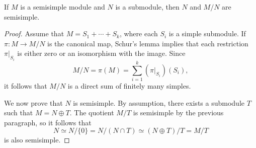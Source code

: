 \begin{proposition}
    If $M$ is a semisimple module and $N$ is a submodule, then $N$ and $M/N$ are semisimple.	
\end{proposition}

\begin{proof}
	Assume that $M=S_1+\cdots+ S_k$, where each $S_i$ is a simple submodule. If $\pi\colon M\to M/N$ 
	is the canonical map, Schur's lemma implies that each restriction $\pi|_{S_i}$ 
	is either zero or an isomorphism with the image. Since  
	\[
	M/N=\pi(M)=\sum_{i=1}^k(\pi|_{S_i})(S_i),
	\]
	it follows that $M/N$ is a direct sum of finitely many simples. 
	
	We now prove that $N$ is semisimple. By assumption, 
	there exists a submodule $T$ such that 
	$M=N\oplus T$. The quotient
	$M/T$ is semisimple by the previous paragraph, so it follows that 
	\[
	N\simeq N/\{0\}=N/(N\cap T)\simeq (N\oplus T)/T=M/T
	\]
	is also semisimple.     
\end{proof}


